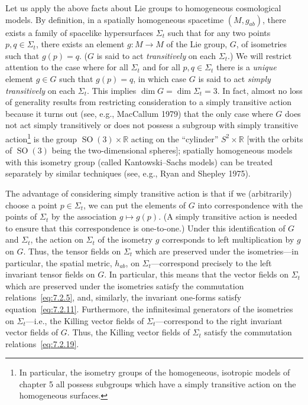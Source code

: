 Let us apply the above facts about Lie groups to homogeneous cosmological models.
By definition, in a spatially homogeneous spacetime \((M,g_{ab})\), there exists
a family of spacelike hypersurfaces \(\Sigma_t\) such that for any two points
\(p,q\in\Sigma_t\), there exists an element \(g\colon M\longrightarrow M\) of the
Lie group, \(G\), of isometries such that \(g(p)=q\). (\(G\) is said to act
\emph{transitively} on each \(\Sigma_t\).) We will restrict attention to the case
where for all \(\Sigma_t\) and for all \(p,q\in\Sigma_t\) there is a
\emph{unique} element \(g\in G\) such that \(g(p)=q\), in which case \(G\) is
said to act \emph{simply transitively} on each \(\Sigma_t\). This implies
\(\dim G=\dim\Sigma_t=3\). In fact, almost no loss of generality results from
restricting consideration to a simply transitive action because it turns out (see,
e.g., MacCallum 1979) that the only case where \(G\) does not act simply
transitively or does not possess a subgroup with simply transitive
action\footnote{In particular, the isometry groups of the homogeneous, isotropic
models of chapter 5 all possess subgroups which have a simply transitive action on
the homogeneous surfaces.} is the group
\(\operatorname{SO}(3)\times\mathbb R\) acting on the “cylinder”
\(S^2\times\mathbb R\) [with the orbits of \(\operatorname{SO}(3)\) being the
two-dimensional spheres]; spatially homogeneous models with this isometry group
(called Kantowski--Sachs models) can be treated separately by similar techniques
(see, e.g., Ryan and Shepley 1975).

The advantage of considering simply transitive action is that if we (arbitrarily)
choose a point \(p\in\Sigma_t\), we can put the elements of \(G\) into
correspondence with the points of \(\Sigma_t\) by the association
\(g\longmapsto g(p)\). (A simply transitive action is needed to ensure that this
correspondence is one-to-one.) Under this identification of \(G\) and \(\Sigma_t\),
the action on \(\Sigma_t\) of the isometry \(g\) corresponds to left
multiplication by \(g\) on \(G\). Thus, the tensor fields on \(\Sigma_t\) which
are preserved under the isometries---in particular, the spatial metric, \(h_{ab}\),
on \(\Sigma_t\)---correspond precisely to the left invariant tensor fields on
\(G\). In particular, this means that the vector fields on \(\Sigma_t\) which are
preserved under the isometries satisfy the commutation
relations~\eqref{eq:7.2.5}, and, similarly, the invariant one-forms satisfy
equation~\eqref{eq:7.2.11}. Furthermore, the infinitesimal generators of the
isometries on \(\Sigma_t\)---i.e., the Killing vector fields of
\(\Sigma_t\)---correspond to the right invariant vector fields of \(G\). Thus,
the Killing vector fields of \(\Sigma_t\) satisfy the commutation
relations~\eqref{eq:7.2.19}.

